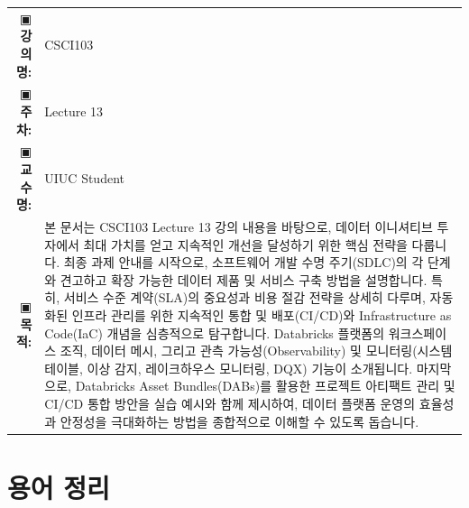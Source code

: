 \documentclass[11pt,a4paper]{article}
\makeatletter
\theoremstyle{definition}
\newcommand{\metainfo}[4]{
\begin{tcolorbox}[
    colback=lightpurple,
    colframe=darkpurple,
    boxrule=1pt,
    arc=2mm,
    left=10pt,
    right=10pt,
    top=8pt,
    bottom=8pt
]
\begin{tabular}{@{}rl@{}}
▣ \textbf{강의명:} & #1 \\[0.3em]
▣ \textbf{주차:} & #2 \\[0.3em]
▣ \textbf{교수명:} & #3 \\[0.3em]
▣ \textbf{목적:} & \begin{minipage}[t]{0.75\textwidth}#4\end{minipage}
\end{tabular}
\end{tcolorbox}
}
\makeatother
\begin{document}

\thispagestyle{firstpage}

\metainfo{CSCI103}{Lecture 13}{UIUC Student}{본 문서는 CSCI103 Lecture 13 강의 내용을 바탕으로, 데이터 이니셔티브 투자에서 최대 가치를 얻고 지속적인 개선을 달성하기 위한 핵심 전략을 다룹니다. 최종 과제 안내를 시작으로, 소프트웨어 개발 수명 주기(SDLC)의 각 단계와 견고하고 확장 가능한 데이터 제품 및 서비스 구축 방법을 설명합니다. 특히, 서비스 수준 계약(SLA)의 중요성과 비용 절감 전략을 상세히 다루며, 자동화된 인프라 관리를 위한 지속적인 통합 및 배포(CI/CD)와 Infrastructure as Code(IaC) 개념을 심층적으로 탐구합니다. Databricks 플랫폼의 워크스페이스 조직, 데이터 메시, 그리고 관측 가능성(Observability) 및 모니터링(시스템 테이블, 이상 감지, 레이크하우스 모니터링, DQX) 기능이 소개됩니다. 마지막으로, Databricks Asset Bundles(DABs)를 활용한 프로젝트 아티팩트 관리 및 CI/CD 통합 방안을 실습 예시와 함께 제시하여, 데이터 플랫폼 운영의 효율성과 안정성을 극대화하는 방법을 종합적으로 이해할 수 있도록 돕습니다.}

\tableofcontents

\newpage

\section{용어 정리} %
\end{document}
